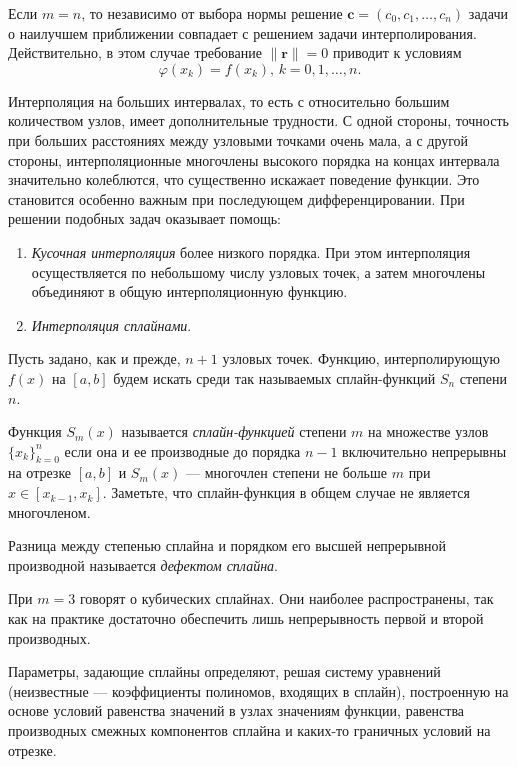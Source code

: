 Если $m=n$, то независимо от выбора нормы решение
$\mathbf{c}=(c_{0},c_{1},\dots,c_{n})$ задачи о наилучшем приближении
совпадает с решением задачи интерполирования.  Действительно, в этом
случае требование $\|\mathbf{r}\|=0$ приводит к условиям
\[
\varphi(x_{k})=f(x_{k}),\, k=0,1,\dots,n.
\]


Интерполяция на больших интервалах, то есть с относительно большим
количеством узлов, имеет дополнительные трудности. С одной стороны,
точность при больших расстояниях между узловыми точками очень мала, а
с другой стороны, интерполяционные многочлены высокого порядка на
концах интервала значительно колеблются, что существенно искажает
поведение функции. Это становится особенно важным при последующем
дифференцировании. При решении подобных задач оказывает помощь:

\begin{enumerate}
\item \emph{Кусочная интерполяция} более
  низкого порядка. При этом интерполяция осуществляется по небольшому
  числу узловых точек, а затем многочлены объединяют в общую
  интерполяционную функцию.
\item \emph{Интерполяция сплайнами}.
\end{enumerate}
Пусть задано, как и прежде, $n+1$ узловых точек. Функцию,
интерполирующую $f(x)$ на $[a,b]$ будем искать среди так называемых
сплайн-функций $S_{n}$ степени $n$.

Функция $S_{m}(x)$ называется
\emph{сплайн-функцией} степени $m$ на множестве
узлов $\{x_{k}\}_{k=0}^{n}$ если она и ее производные до порядка $n-1$
включительно непрерывны на отрезке $[a,b]$ и $S_{m}(x)$ --- многочлен
степени не больше $m$ при $x\in[x_{k-1},x_{k}]$.  Заметьте, что
сплайн-функция в общем случае не является многочленом.

Разница между степенью сплайна и порядком его высшей непрерывной производной
называется \emph{дефектом сплайна}.

При $m=3$ говорят о кубических сплайнах. Они наиболее распространены,
так как на практике достаточно обеспечить лишь непрерывность первой и
второй производных.

Параметры, задающие сплайны определяют, решая систему уравнений
(неизвестные --- коэффициенты полиномов, входящих в сплайн),
построенную на основе условий равенства значений в узлах значениям
функции, равенства производных смежных компонентов сплайна и каких-то
граничных условий на отрезке.

